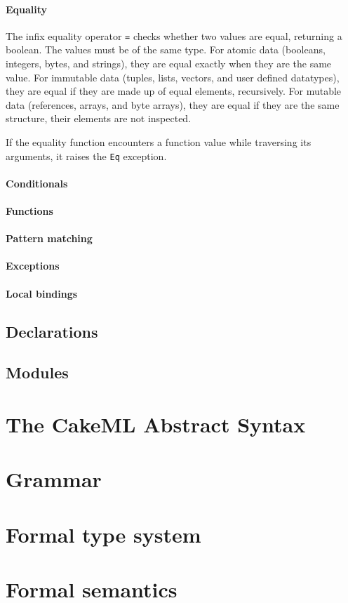 \documentclass{article}
\begin{document}
\paragraph{Equality}

The infix equality operator \texttt{=} checks whether two values are equal, returning a boolean. The values must be of the same type. For atomic data (booleans, integers, bytes, and strings), they are equal exactly when they are the same value. For immutable data (tuples, lists, vectors, and user defined datatypes), they are equal if they are made up of equal elements, recursively. For mutable data (references, arrays, and byte arrays), they are equal if they are the same structure, their elements are not inspected.

If the equality function encounters a function value while traversing its arguments, it raises the \texttt{Eq} exception.

\paragraph{Conditionals}

\paragraph{Functions}

\paragraph{Pattern matching}

\paragraph{Exceptions}

\paragraph{Local bindings}

\subsection{Declarations}
\label{declarations}

\subsection{Modules}

\section{The CakeML Abstract Syntax}

\appendix

\section{Grammar}

\section{Formal type system}

\section{Formal semantics}
\end{document}
